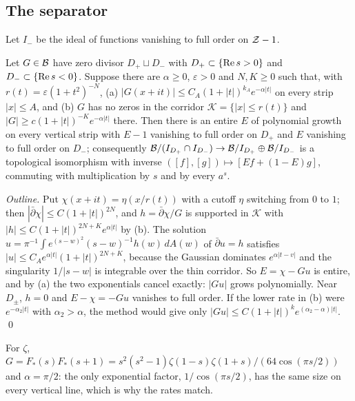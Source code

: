 \subsection{The separator}

Let $I_-$ be the ideal of functions vanishing to full order on $\mathcal{Z}-1$.

\begin{lemma}\label{lem:separator}
Let $G\in\mathcal{B}$ have zero divisor $D_+\sqcup D_-$ with $D_+\subset\{\operatorname{Re} s>0\}$ and $D_-\subset\{\operatorname{Re} s<0\}$. Suppose there are $\alpha\ge0$, $\varepsilon>0$ and $N,K\ge0$ such that, with $r(t)=\varepsilon(1+t^2)^{-N}$,
(a) $|G(x+it)|\le C_A(1+|t|)^{k_A}e^{-\alpha|t|}$ on every strip $|x|\le A$, and
(b) $G$ has no zeros in the corridor $\mathcal{K}=\{|x|\le r(t)\}$ and $|G|\ge c(1+|t|)^{-K}e^{-\alpha|t|}$ there.
Then there is an entire $E$ of polynomial growth on every vertical strip with $E-1$ vanishing to full order on $D_+$ and $E$ vanishing to full order on $D_-$; consequently $\mathcal{B}/(I_{D_+}\cap I_{D_-})\to\mathcal{B}/I_{D_+}\oplus\mathcal{B}/I_{D_-}$ is a topological isomorphism with inverse $([f],[g])\mapsto[Ef+(1-E)g]$, commuting with multiplication by $s$ and by every $a^s$.
\end{lemma}

\emph{Outline.} Put $\chi(x+it)=\eta(x/r(t))$ with a cutoff $\eta$ switching from $0$ to $1$; then $|\bar\partial\chi|\le C(1+|t|)^{2N}$, and $h=\bar\partial\chi/G$ is supported in $\mathcal{K}$ with $|h|\le C(1+|t|)^{2N+K}e^{\alpha|t|}$ by (b). The solution $u=\pi^{-1}\int e^{(s-w)^2}(s-w)^{-1}h(w)\,dA(w)$ of $\bar\partial u=h$ satisfies $|u|\le C_Ae^{\alpha|t|}(1+|t|)^{2N+K}$, because the Gaussian dominates $e^{\alpha|t-v|}$ and the singularity $1/|s-w|$ is integrable over the thin corridor. So $E=\chi-Gu$ is entire, and by (a) the two exponentials cancel exactly: $|Gu|$ grows polynomially. Near $D_\pm$, $h=0$ and $E-\chi=-Gu$ vanishes to full order. If the lower rate in (b) were $e^{-\alpha_2|t|}$ with $\alpha_2>\alpha$, the method would give only $|Gu|\le C(1+|t|)^ke^{(\alpha_2-\alpha)|t|}$. \qed

For $\zeta$, $G=F_*(s)F_*(s+1)=s^2(s^2-1)\zeta(1-s)\zeta(1+s)/(64\cos(\pi s/2))$ and $\alpha=\pi/2$: the only exponential factor, $1/\cos(\pi s/2)$, has the same size on every vertical line, which is why the rates match.

